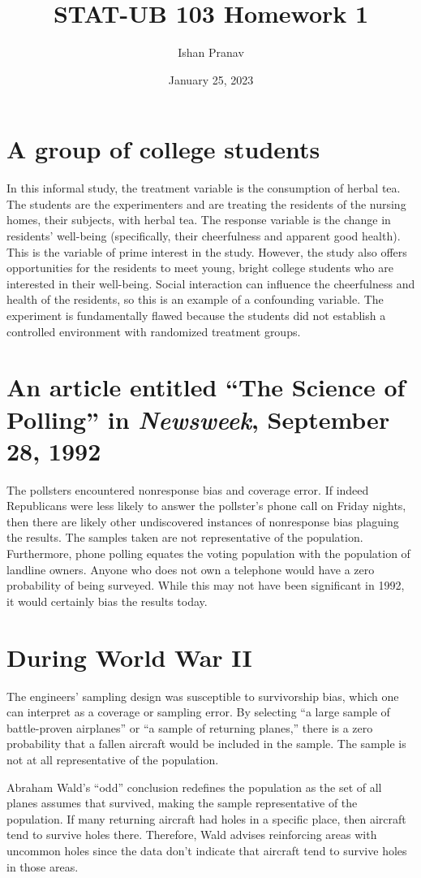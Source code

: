 \documentclass[12pt]{article}
\title{STAT-UB 103 Homework 1}
\author{Ishan Pranav}
\date{January 25, 2023}
\begin{document}
\maketitle
\section{A group of college students}
In this informal study, the treatment variable is the consumption of herbal tea. The students are the experimenters and are treating the residents of the nursing homes, their subjects, with herbal tea. The response variable is the change in residents' well-being (specifically, their cheerfulness and apparent good health). This is the variable of prime interest in the study. However, the study also offers opportunities for the residents to meet young, bright college students who are interested in their well-being. Social interaction can influence the cheerfulness and health of the residents, so this is an example of a confounding variable. The experiment is fundamentally flawed because the students did not establish a controlled environment with randomized treatment groups. 
\section{An article entitled ``The Science of Polling'' in \emph{Newsweek}, September 28, 1992}
The pollsters encountered nonresponse bias and coverage error. If indeed Republicans were less likely to answer the pollster's phone call on Friday nights, then there are likely other undiscovered instances of nonresponse bias plaguing the results. The samples taken are not representative of the population. Furthermore, phone polling equates the voting population with the population of landline owners. Anyone who does not own a telephone would have a zero probability of being surveyed. While this may not have been significant in 1992, it would certainly bias the results today.
\section{During World War II}
The engineers' sampling design was susceptible to survivorship bias, which one can interpret as a coverage or sampling error. By selecting ``a large sample of battle-proven airplanes'' or ``a sample of returning planes,'' there is a zero probability that a fallen aircraft would be included in the sample. The sample is not at all representative of the population.

Abraham Wald's ``odd'' conclusion redefines the population as the set of all planes assumes that survived, making the sample representative of the population. If many returning aircraft had holes in a specific place, then aircraft tend to survive holes there. Therefore, Wald advises reinforcing areas with uncommon holes since the data don't indicate that aircraft tend to survive holes in those areas. 
\end{document}
